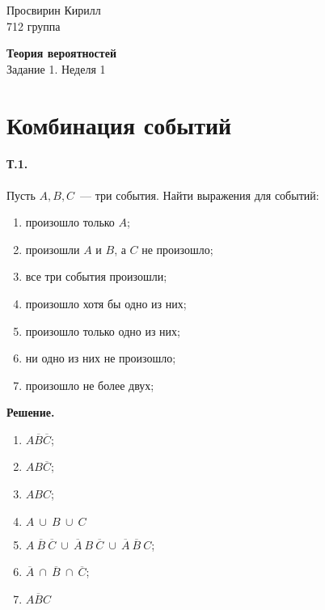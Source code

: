 \documentclass[a4paper,12pt]{article} %
\begin{document}

\hfill
\begin{minipage}{4cm}
	Просвирин Кирилл\\
	712 группа\\
\end{minipage}

\begin{center}
	\Large\textbf{Теория вероятностей\\} 
	\large Задание 1. Неделя 1
\end{center}

\section{Комбинация событий}

\paragraph{Т.1.} Пусть $ A, B, C $~--- три события. 
Найти выражения для событий:
\begin{enumerate}
	\item произошло только $ A $;
	\item произошли $ A $ и $ B $, а $ C $ не произошло;
	\item все три события произошли;
	\item произошло хотя бы одно из них;
	\item произошло только одно из них;
	\item ни одно из них не произошло;
	\item произошло не более двух;
\end{enumerate}

\textbf{Решение.}

\begin{enumerate}
	\item $ A\overline{B}\overline{C} $;
	\item $ AB\overline{C} $;
	\item $ ABC $;
	\item $ A~\cup~B~\cup~C $
	\item $ A~\overline{B}~\overline{C}~
	\cup~\overline{A}~B~\overline{C}~
	\cup~\overline{A}~\overline{B}~C $;
	\item $ \overline{A}~\cap~\overline{B}~\cap~\overline{C} $;
	\item $ \overline{ABC} $
\end{enumerate}
\end{document}
